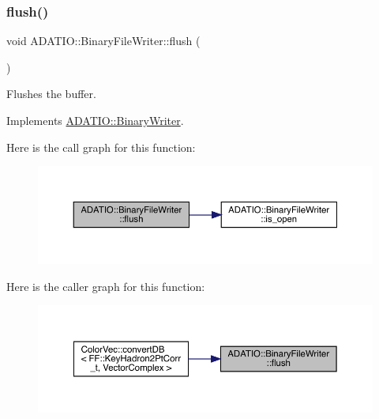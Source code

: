 \subsubsection{\texorpdfstring{flush()}{flush()}\hspace{0.1cm}{\footnotesize\ttfamily [2/3]}}
{\footnotesize\ttfamily void A\+D\+A\+T\+I\+O\+::\+Binary\+File\+Writer\+::flush (\begin{DoxyParamCaption}{ }\end{DoxyParamCaption})\hspace{0.3cm}{\ttfamily [virtual]}}



Flushes the buffer. 



Implements \mbox{\hyperlink{classADATIO_1_1BinaryWriter_a1d335eeed64094b8641f3ebf731c981e}{A\+D\+A\+T\+I\+O\+::\+Binary\+Writer}}.

Here is the call graph for this function\+:
\nopagebreak
\begin{figure}[H]
\begin{center}
\leavevmode
\includegraphics[width=350pt]{dc/d11/classADATIO_1_1BinaryFileWriter_ad914b901c6386a2ad7b2c8cf9bddfa9b_cgraph}
\end{center}
\end{figure}
Here is the caller graph for this function\+:
\nopagebreak
\begin{figure}[H]
\begin{center}
\leavevmode
\includegraphics[width=350pt]{dc/d11/classADATIO_1_1BinaryFileWriter_ad914b901c6386a2ad7b2c8cf9bddfa9b_icgraph}
\end{center}
\end{figure}
\mbox{\label{classADATIO_1_1BinaryFileWriter_ad914b901c6386a2ad7b2c8cf9bddfa9b}} 
